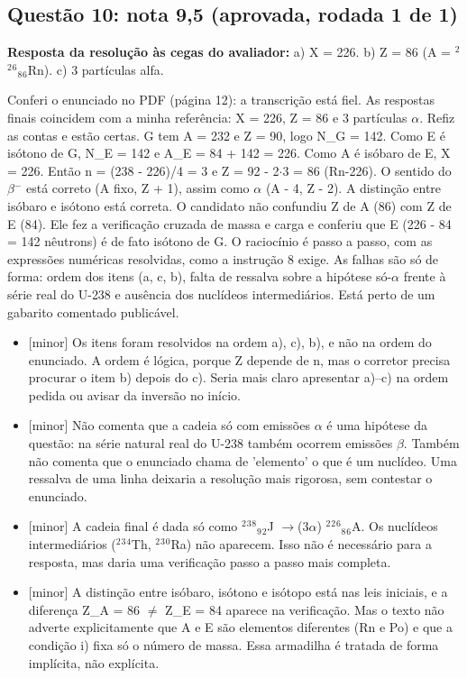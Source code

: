 \documentclass{article}%
\begin{document}
\subsection*{Questão 10: nota 9,5 (aprovada, rodada 1 de 1)}%
\textbf{Resposta da resolução às cegas do avaliador:} a) X = 226. b) Z = 86 (A = $^2$$^2$$^{6}$$_{8}$$_{6}$Rn). c) 3 partículas alfa.\par %
Conferi o enunciado no PDF (página 12): a transcrição está fiel. As respostas finais coincidem com a minha referência: X = 226, Z = 86 e 3 partículas $\alpha$. Refiz as contas e estão certas. G tem A = 232 e Z = 90, logo N\_G = 142. Como E é isótono de G, N\_E = 142 e A\_E = 84 + 142 = 226. Como A é isóbaro de E, X = 226. Então n = (238 - 226)/4 = 3 e Z = 92 - 2$\cdot$3 = 86 (Rn{-}226). O sentido do $\beta$$^{-}$ está correto (A fixo, Z + 1), assim como $\alpha$ (A - 4, Z - 2). A distinção entre isóbaro e isótono está correta. O candidato não confundiu Z de A (86) com Z de E (84). Ele fez a verificação cruzada de massa e carga e conferiu que E (226 - 84 = 142 nêutrons) é de fato isótono de G. O raciocínio é passo a passo, com as expressões numéricas resolvidas, como a instrução 8 exige. As falhas são só de forma: ordem dos itens (a, c, b), falta de ressalva sobre a hipótese só{-}$\alpha$ frente à série real do U{-}238 e ausência dos nuclídeos intermediários. Está perto de um gabarito comentado publicável.%
\begin{itemize}%
\item%
{[}minor{]} Os itens foram resolvidos na ordem a), c), b), e não na ordem do enunciado. A ordem é lógica, porque Z depende de n, mas o corretor precisa procurar o item b) depois do c). Seria mais claro apresentar a)--c) na ordem pedida ou avisar da inversão no início.%
\item%
{[}minor{]} Não comenta que a cadeia só com emissões $\alpha$ é uma hipótese da questão: na série natural real do U{-}238 também ocorrem emissões $\beta$. Também não comenta que o enunciado chama de 'elemento' o que é um nuclídeo. Uma ressalva de uma linha deixaria a resolução mais rigorosa, sem contestar o enunciado.%
\item%
{[}minor{]} A cadeia final é dada só como $^2$$^3$$^{8}$$_{9}$$_{2}$J $\to$(3$\alpha$) $^2$$^2$$^{6}$$_{8}$$_{6}$A. Os nuclídeos intermediários ($^2$$^3$$^{4}$Th, $^2$$^3$$^{0}$Ra) não aparecem. Isso não é necessário para a resposta, mas daria uma verificação passo a passo mais completa.%
\item%
{[}minor{]} A distinção entre isóbaro, isótono e isótopo está nas leis iniciais, e a diferença Z\_A = 86 $\neq$ Z\_E = 84 aparece na verificação. Mas o texto não adverte explicitamente que A e E são elementos diferentes (Rn e Po) e que a condição i) fixa só o número de massa. Essa armadilha é tratada de forma implícita, não explícita.%
\end{itemize}%
\end{document}
